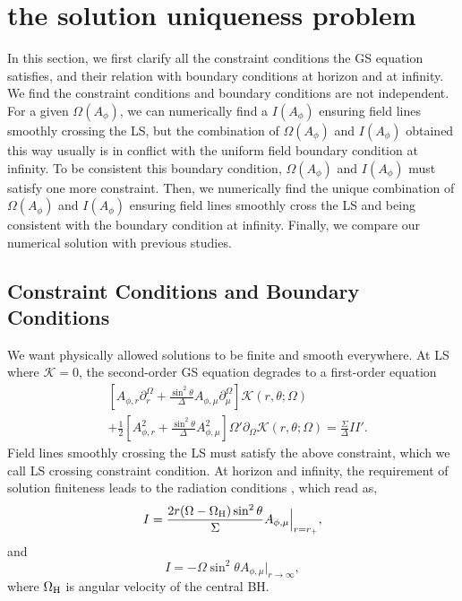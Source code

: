 \documentclass[iop,apj]{emulateapj}
\def\sst{\sin^2\theta}
\def\Ar{A_{\phi,r}}
\def\Am{A_{\phi,\mu}}
\def\be{\begin{equation}}
\def\ee{\end{equation}}
\def\WH{\Omega_{\rm H}}
\begin{document}
\section{the solution uniqueness problem}
\label{sec:sketch}


In this section, we first clarify all the constraint conditions the GS equation satisfies,
and their relation with boundary conditions at horizon and at infinity.
We find the constraint conditions and boundary conditions are not independent.
For a given $\Omega(A_\phi)$, we can numerically
find a $I(A_\phi)$ ensuring field lines smoothly crossing the LS, but the combination of
$\Omega(A_\phi)$ and $I(A_\phi)$ obtained this way usually is in conflict with the uniform field boundary
condition at infinity. To be consistent this boundary condition, $\Omega(A_\phi)$ and $I(A_\phi)$ must
satisfy one more constraint. Then, we numerically find the unique combination of $\Omega(A_\phi)$ and $I(A_\phi)$
ensuring field lines smoothly cross the LS and being consistent with the boundary condition at infinity.
Finally, we compare our numerical solution with previous studies.

\subsection{Constraint Conditions and Boundary Conditions}
We want physically allowed solutions to be finite and smooth everywhere.
At LS where $\mathcal K = 0$, the second-order GS equation degrades to a first-order equation
\be
\label{eq:ls}
\begin{aligned}
& \left[\Ar \partial_r^\Omega  +  \frac{\sst}{\Delta}\Am \partial_\mu^\Omega\right] \mathcal K(r,\theta; \Omega ) \\
&+  \frac{1}{2}\left[\Ar^2 + \frac{\sst}{\Delta}\Am^2\right]  \Omega' \partial_\Omega \mathcal K(r,\theta; \Omega)
= \frac{\Sigma}{\Delta}II'.
\end{aligned}
\ee
Field lines smoothly crossing the LS must satisfy the above constraint,
which we call LS crossing constraint condition. At horizon and infinity,
the requirement of solution finiteness leads to the radiation conditions \citep[e.g.][]{Pan2016},
which read as,
\be
\label{eq:znajek}
    I = \frac{2r(\Omega-\WH)\sst}{\Sigma} \Am \Big|_{r=r_+},
\ee
and
\be
\label{eq:infty}
    I = -\Omega\sst \Am \Big|_{r\rightarrow \infty},
\ee
where $\WH$ is angular velocity of the central BH.
\end{document}
